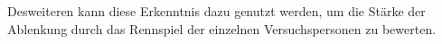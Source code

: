 \documentclass[12pt,a4paper]{scrartcl}
\begin{document}
Desweiteren kann diese Erkenntnis dazu genutzt werden, um die Stärke der Ablenkung durch das Rennspiel der einzelnen Versuchspersonen zu bewerten. 

\end{document}
